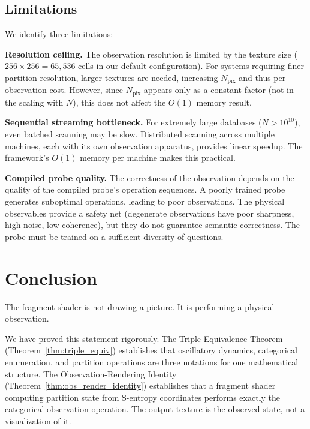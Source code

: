 \documentclass[11pt,twocolumn,a4paper]{article}
\theoremstyle{definition}
\theoremstyle{remark}
\newcommand{\Npix}{N_{\mathrm{pix}}}
\begin{document}
\subsection{Limitations}

We identify three limitations:

\textbf{Resolution ceiling.} The observation resolution is limited by the texture size ($256 \times 256 = 65{,}536$ cells in our default configuration). For systems requiring finer partition resolution, larger textures are needed, increasing $\Npix$ and thus per-observation cost. However, since $\Npix$ appears only as a constant factor (not in the scaling with $N$), this does not affect the $O(1)$ memory result.

\textbf{Sequential streaming bottleneck.} For extremely large databases ($N > 10^{10}$), even batched scanning may be slow. Distributed scanning across multiple machines, each with its own observation apparatus, provides linear speedup. The framework's $O(1)$ memory per machine makes this practical.

\textbf{Compiled probe quality.} The correctness of the observation depends on the quality of the compiled probe's operation sequences. A poorly trained probe generates suboptimal operations, leading to poor observations. The physical observables provide a safety net (degenerate observations have poor sharpness, high noise, low coherence), but they do not guarantee semantic correctness. The probe must be trained on a sufficient diversity of questions.


\section{Conclusion}
\label{sec:conclusion}

The fragment shader is not drawing a picture. It is performing a physical observation.

We have proved this statement rigorously. The Triple Equivalence Theorem (Theorem~\ref{thm:triple_equiv}) establishes that oscillatory dynamics, categorical enumeration, and partition operations are three notations for one mathematical structure. The Observation-Rendering Identity (Theorem~\ref{thm:obs_render_identity}) establishes that a fragment shader computing partition state from S-entropy coordinates performs exactly the categorical observation operation. The output texture is the observed state, not a visualization of it.
\end{document}
